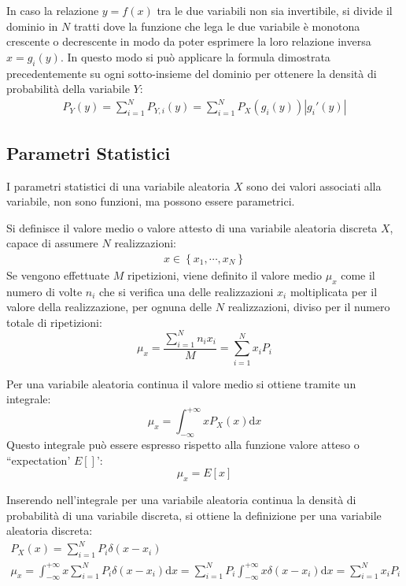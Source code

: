 \documentclass{article}
\newcommand{\df}{\mathrm{d}}
\numberwithin{equation}{subsection}
\begin{document}
In caso la relazione $y=f(x)$ tra le due variabili non sia invertibile, si divide il dominio in $N$ tratti dove la funzione che lega le due variabile è monotona crescente o 
decrescente in modo da poter esprimere la loro relazione inversa $x=g_i(y)$. In questo modo si può applicare la formula dimostrata precedentemente su ogni 
sotto-insieme del dominio per ottenere la densità di probabilità della variabile $Y$:
\begin{gather*}
    P_Y(y)=\displaystyle\sum_{i=1}^NP_{Y,i}(y)=\sum_{i=1}^NP_X(g_i(y))|g_i'(y)|
\end{gather*} 

\subsection{Parametri Statistici}
\label{sec:parametri-statistici}

I parametri statistici di una variabile aleatoria $X$ sono dei valori associati alla variabile, non sono funzioni, ma possono essere parametrici. 

Si definisce il valore medio o valore attesto di una variabile aleatoria discreta $X$, capace di assumere $N$ realizzazioni:
\begin{gather*}
    x\in\left\{x_1,\cdots,x_N\right\}
\end{gather*}
Se vengono effettuate $M$ ripetizioni, viene definito il valore medio $\mu_x$ come il numero di volte $n_i$ che si verifica una delle realizzazioni $x_i$ moltiplicata per 
il valore della realizzazione, per ognuna delle $N$ realizzazioni, diviso per il numero totale di ripetizioni:
\begin{equation}
    \mu_x=\displaystyle\frac{\displaystyle\sum_{i=1}^Nn_ix_i}{M}=\sum_{i=1}^Nx_iP_i
\end{equation}

Per una variabile aleatoria continua il valore medio si ottiene tramite un integrale:
\begin{equation}
    \mu_x=\displaystyle\int_{-\infty}^{+\infty}xP_X(x)\df x
\end{equation}
Questo integrale può essere espresso rispetto alla funzione valore atteso o ``expectation' $E[]$':
\begin{equation}
    \mu_x=E[x]
\end{equation}


Inserendo nell'integrale per una variabile aleatoria continua la densità di probabilità di una variabile discreta, si ottiene la definizione per una variabile aleatoria discreta:
\begin{gather*}
    P_X(x)=\displaystyle\sum_{i=1}^NP_i\delta(x-x_i)\\
    \mu_x=\displaystyle\int_{-\infty}^{+\infty}x\sum_{i=1}^NP_i\delta(x-x_i)\df x=\sum_{i=1}^NP_i\int_{-\infty}^{+\infty}x\delta(x-x_i)\df x=\sum_{i=1}^Nx_iP_i
\end{gather*}
\end{document}
